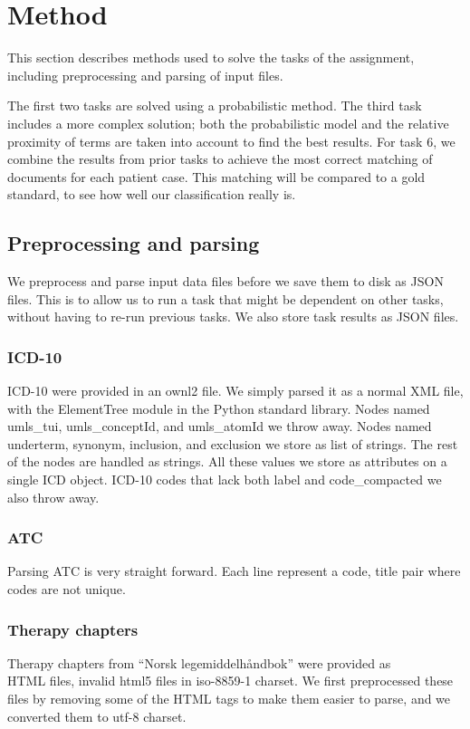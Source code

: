 \chapter{Method}
\label{cha:method}
This section describes methods used to solve the tasks of the assignment, including
preprocessing and parsing of input files. 

The first two tasks are solved using a probabilistic method. The third task includes a more complex solution; both the probabilistic model and the relative proximity of terms are taken into account to find the best results. For task 6, we combine the results from prior tasks to achieve the most correct matching of documents for each patient case. This matching will be compared to a gold standard, to see how well our classification really is.


\section{Preprocessing and parsing}
We preprocess and parse input data files before we save them to disk as JSON
files. This is to allow us to run a task that might be dependent on other tasks, without having to re-run previous tasks. We also store task
results as JSON files.

\subsection{ICD-10}
ICD-10 were provided in an ownl2 file. We simply parsed it as a normal XML
file, with the ElementTree module in the Python standard library.
Nodes named umls\_tui, umls\_conceptId, and umls\_atomId we throw away.
Nodes named underterm, synonym, inclusion, and exclusion we store as list of
strings. The rest of the nodes are handled as strings. All these values we
store as attributes on a single ICD object. ICD-10 codes that lack both label
and code\_compacted we also throw away.

\subsection{ATC}
Parsing ATC is very straight forward. Each line represent a code, title
pair where codes are not unique.

\subsection{Therapy chapters}
Therapy chapters from ``Norsk legemiddelhåndbok'' were provided as\\
HTML files, invalid html5 files in iso-8859-1 charset. We first preprocessed
these files by removing some of the HTML tags to make them easier to parse,
and we converted them to utf-8 charset.

